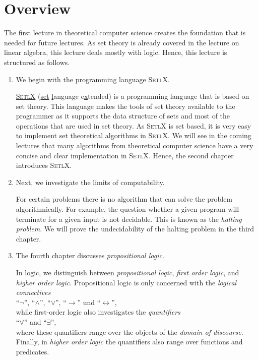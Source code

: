 \section{Overview} 
The first lecture in theoretical computer science creates the foundation that is needed for future lectures.
As set theory is already covered in the lecture on linear algebra, this lecture deals mostly with logic.
Hence, this lecture is structured as follows.
\begin{enumerate}
\item We begin with the programming language \textsc{SetlX}.

      \href{http://randoom.org/Software/SetlX}{\textsc{SetlX}} (\underline{set} \underline{l}anguage
      e\underline{x}tended) is a programming language that is based on set theory.  This language
      makes the tools of set theory available to the programmer as it supports the data structure of
      sets and most of the operations that are used in set theory.  As \textsc{SetlX} is set based,
      it is very easy to implement set theoretical algorithms in \textsc{SetlX}.  We will see in the
      coming lectures that many algorithms from theoretical computer science have a very concise
      and clear implementation in \textsc{SetlX}.  Hence, the second chapter introduces \textsc{SetlX}.
\item Next, we investigate the limits of computability.

      For certain problems there is no algorithm that can solve the problem algorithmically. 
      For example, the question whether a given program will terminate for a given input is not
      decidable.  This is known as the {\color{blue}\emph{halting problem}}.  We will prove the undecidability of
      the halting problem in the third chapter. 
\item The fourth chapter discusses \emph{\color{blue}propositional logic}.

      In logic, we distinguish between  \emph{propositional logic},
      \emph{\color{blue}first order logic}, and \emph{\color{blue}higher order logic}.  Propositional logic is only
      concerned with the \emph{\color{blue}logical connectives}
      \\[0.2cm]
      \hspace*{1.3cm}
      ``$\neg$'', ``$\wedge$'', ``$\vee$'', ``$\rightarrow$'' und ``$\leftrightarrow$'',
      \\[0.2cm]
      while first-order logic also investigates the \emph{\color{blue}quantifiers}
      \\[0.2cm]
      \hspace*{1.3cm}
      ``$\forall$'' and ``$\exists$'',
      \\[0.2cm]
      where these quantifiers range over the objects of the \emph{domain of discourse}.
      Finally, in \emph{higher order logic} the quantifiers also range over functions and predicates.


\end{enumerate}
